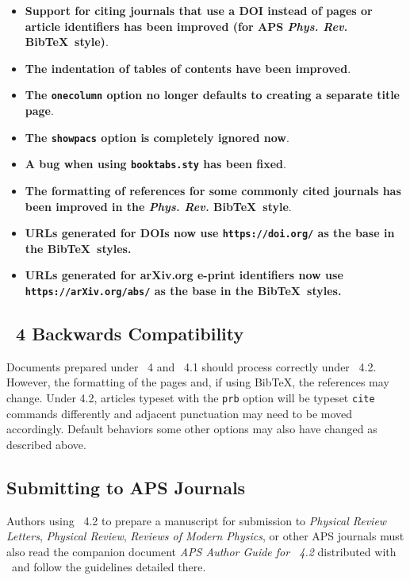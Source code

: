 \documentclass[%
,aps%
 ,twocolumn%
 ,secnumarabic%
,amssymb, amsmath,nobibnotes, aps, prl, floatfix]{revtex4-2}
\begin{document}
\begin{itemize}
\item \textbf{Support for citing journals that use a DOI instead of pages or article identifiers has been improved (for APS \textit{Phys. Rev.} Bib\TeX\ style)}.

\item \textbf{The indentation of tables of contents have been improved}.

\item \textbf{The \texttt{onecolumn} option no longer defaults to creating a separate title page}.

\item \textbf{The \texttt{showpacs} option is completely ignored now}.

\item \textbf{A bug when using \texttt{booktabs.sty} has been fixed}.

\item \textbf{The formatting of references for some commonly cited journals has been improved in the \textit{Phys. Rev.} Bib\TeX\ style}.

\item \textbf{URLs generated for DOIs now use \texttt{https://doi.org/} as the base in the Bib\TeX\ styles.}

\item \textbf{URLs generated for arXiv.org e-print identifiers now use \texttt{https://arXiv.org/abs/} as the base in the Bib\TeX\ styles.}

\end{itemize}

\subsection{\revtex~4 Backwards Compatibility}
Documents prepared under \revtex~4 and \revtex~4.1 should process correctly under \revtex~4.2. However, the formatting of the pages and, if using Bib\TeX, the references may change. Under 4.2, articles typeset with the \texttt{prb} option will be typeset \texttt{cite} commands differently and adjacent punctuation may need to be moved accordingly. Default behaviors some other options may also have changed as described above.



\subsection{Submitting to APS Journals}

Authors using \revtex~4.2 to prepare a manuscript for submission to
\textit{Physical Review Letters}, \textit{Physical Review},  \textit{Reviews of Modern Physics}, 
or other APS journals must also read the companion document \textit{APS Author Guide for \revtex~4.2}
distributed with \revtex\ and follow the guidelines detailed there.
\end{document}
